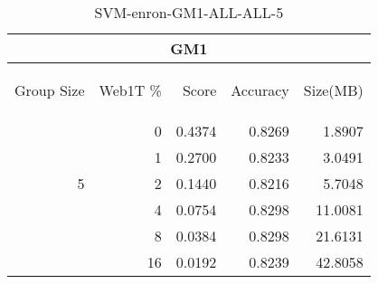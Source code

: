\begin{center}
\begin{table}[htbp] 
 \begin{center}
\begin{tabular}{ | r | r | r | r | r |}
\hline
\multicolumn{5}{|c|}{GM1}\\
\hline
\begin{sideways}Group Size\end{sideways} & \begin{sideways}Web1T \%\end{sideways} & \begin{sideways}Score\end{sideways} & \begin{sideways}Accuracy\end{sideways} & \begin{sideways}Size(MB)\end{sideways}\\
\hline
\multirow{5}{*}{5}
 & 0 & 0.4374 & 0.8269 & 1.8907\\ \cline{2-5}
 & 1 & 0.2700 & 0.8233 & 3.0491\\ \cline{2-5}
 & 2 & 0.1440 & 0.8216 & 5.7048\\ \cline{2-5}
 & 4 & 0.0754 & 0.8298 & 11.0081\\ \cline{2-5}
 & 8 & 0.0384 & 0.8298 & 21.6131\\ \cline{2-5}
 & 16 & 0.0192 & 0.8239 & 42.8058\\ \cline{2-5}
\hline
\end{tabular}
\caption{SVM-enron-GM1-ALL-ALL-5}
\label{table:SVM-enron-GM1-ALL-ALL-5}
\end{center}
 \end{table}
\end{center}

